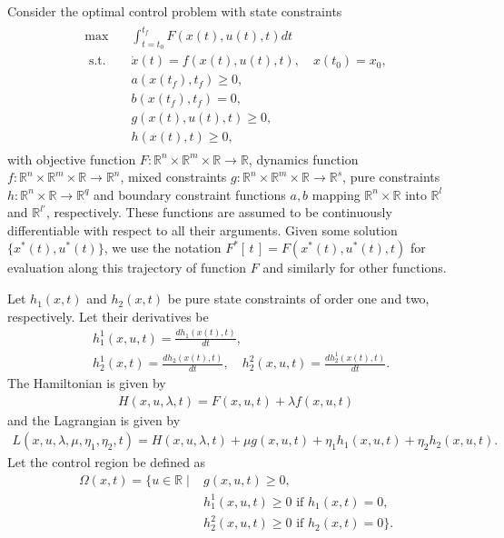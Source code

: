 \documentclass[a4paper]{article}
\theoremstyle{definition}
\theoremstyle{plain}
\begin{document}
Consider the optimal control problem with state constraints
\begin{align}
  \begin{split}
  \max \quad & \int_{t=t_{0}}^{t_{f}} F(x(t), u(t), t) dt \\
  \text{ s.t. } \;\, & \dot{x}(t) = f(x(t), u(t), t) , \quad x(t_{0}) = x_{0} , \\
             & a(x(t_{f}), t_{f}) \geq 0 , \\
             & b(x(t_{f}), t_{f}) = 0 , \\
                & g(x(t), u(t), t) \geq 0 , \\
             & h(x(t), t) \geq 0 ,
  \end{split}
\end{align}
with objective function
$F:\mathbb{R}^{n} \times \mathbb{R}^{m} \times \mathbb{R} \rightarrow \mathbb{R}$,
dynamics function
$f:\mathbb{R}^{n}\times\mathbb{R}^{m}\times\mathbb{R} \rightarrow \mathbb{R}^{n}$,
mixed constraints
$g: \mathbb{R}^{n}\times\mathbb{R}^{m}\times\mathbb{R} \rightarrow \mathbb{R}^{s}$,
pure constraints $h: \mathbb{R}^{n}\times\mathbb{R}\rightarrow \mathbb{R}^{q}$
and boundary constraint functions $a,b$ mapping $\mathbb{R}^{n}\times\mathbb{R}$
into $\mathbb{R}^{l}$ and $\mathbb{R}^{l'}$, respectively. These functions are
assumed to be continuously differentiable with respect to all their arguments.
%
Given some solution $\{x^{*}(t), u^{*}(t)\}$, we use the notation
$F^{*}[\,t\,] = F(x^{*}(t), u^{*}(t), t)$ for evaluation along this trajectory of
function $F$ and similarly for other functions.


Let $h_{1}(x,t)$ and $h_{2}(x,t)$ be pure state constraints of order
one and two, respectively. Let their derivatives be
\begin{align*}
  &h_{1}^{1}(x,u,t) = \frac{d h_{1}(x(t), t)}{dt} , \\
  &h_{2}^{1}(x,t) = \frac{d h_{2}(x(t), t)}{dt} , \quad
  h_{2}^{2}(x,u,t) = \frac{d h_{2}^{1}(x(t), t)}{dt} .
\end{align*}
%
The Hamiltonian is given by
\begin{align*}
  H(x,u,\lambda,t) = F(x,u,t) + \lambda f(x,u,t)
\end{align*}
and the Lagrangian is given by
\begin{align*}
  L(x,u,\lambda,\mu,\eta_{1},\eta_{2},t) = H(x,u,\lambda,t) + \mu g(x,u,t) + \eta_{1} h_{1}(x,u,t) + \eta_{2} h_{2}(x,u,t) .
\end{align*}
Let the control region be defined as
\begin{align*}
  \Omega(x,t) = \{ u \in \mathbb{R} \; | \; & g(x,u,t) \geq 0, \\ &h_{1}^{1}(x,u,t) \geq 0 \text{ if } h_{1}(x,t) = 0, \\
  &h_{2}^{2}(x,u,t) \geq 0 \text{ if } h_{2}(x,t) = 0 \} .
\end{align*}
\end{document}
